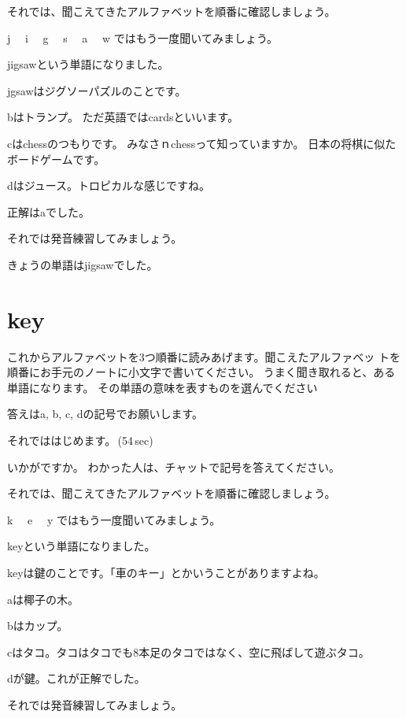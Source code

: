 \documentclass[12pt]{jlreq}
\newcommand{\myMouse}{%
  {\large \ComputerMouse}
}
\begin{document}
それでは、聞こえてきたアルファベットを順番に確認しましょう。{\large \ComputerMouse}

j\,\,
{\large \ComputerMouse}\,\,
i\,\,
{\large \ComputerMouse}\,\,
g\,\,
{\large \ComputerMouse}\,\,
s\,\,
{\large \ComputerMouse}\,\,
a\,\,
\myMouse\,\,
w
ではもう一度聞いてみましょう。


jigsawという単語になりました。

jgsawはジグソーパズルのことです。

bはトランプ。
ただ英語ではcardsといいます。

cはchessのつもりです。
みなさｎchessって知っていますか。
日本の将棋に似たボードゲームです。

dはジュース。トロピカルな感じですね。



正解はaでした。

それでは発音練習してみましょう。

きょうの単語はjigsawでした。
\newpage
\section{key}

これからアルファベットを3つ順番に読みあげます。聞こえたアルファベッ
トを順番にお手元のノートに小文字で書いてください。
うまく聞き取れると、ある単語になります。
その単語の意味を表すものを選んでください

答えはa, b, c, dの記号でお願いします。

それでははじめます。\faVolumeUp\,(54\,sec)

いかがですか。
わかった人は、チャットで記号を答えてください。

それでは、聞こえてきたアルファベットを順番に確認しましょう。{\large \ComputerMouse}

k\,\,
{\large \ComputerMouse}\,\,
e\,\,
{\large \ComputerMouse}\,\,
y
ではもう一度聞いてみましょう。

keyという単語になりました。

keyは鍵のことです。「車のキー」とかいうことがありますよね。

aは椰子の木。

bはカップ。

cはタコ。タコはタコでも8本足のタコではなく、空に飛ばして遊ぶタコ。

dが鍵。これが正解でした。


それでは発音練習してみましょう。
\end{document}

